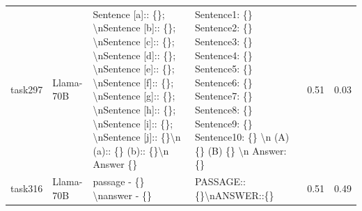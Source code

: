 \begin{longtable}{@{}p{0.8cm\tiny}p{1cm\tiny}p{4.1cm\ttfamily\tiny}p{4.1cm\ttfamily\tiny}p{0.8cm\tiny}p{0.8cm\tiny}@{}}
task297   & Llama-70B  & Sentence  {[}a{]}:: \{\}; \textbackslash{}nSentence  {[}b{]}:: \{\}; \textbackslash{}nSentence  {[}c{]}:: \{\}; \textbackslash{}nSentence  {[}d{]}:: \{\}; \textbackslash{}nSentence  {[}e{]}:: \{\}; \textbackslash{}nSentence  {[}f{]}:: \{\}; \textbackslash{}nSentence  {[}g{]}:: \{\}; \textbackslash{}nSentence  {[}h{]}:: \{\}; \textbackslash{}nSentence  {[}i{]}:: \{\}; \textbackslash{}nSentence  {[}j{]}:: \{\}\textbackslash{}n (a):: \{\} (b):: \{\}\textbackslash{}n Answer \{\}                         & Sentence1: \{\} Sentence2: \{\} Sentence3: \{\} Sentence4: \{\} Sentence5: \{\} Sentence6: \{\} Sentence7: \{\} Sentence8: \{\} Sentence9: \{\} Sentence10: \{\} \textbackslash{}n (A) \{\} (B) \{\} \textbackslash{}n Answer: \{\}                                                                                                                                                                                                                                                                                                                                               & 0.51 & 0.03 \\
task316   & Llama-70B  & passage - \{\} \textbackslash{}nanswer - \{\}                                                                                                                                                                                                                                                                                                                                                                                                                                                                           & PASSAGE::\{\}\textbackslash{}nANSWER::\{\}                                                                                                                                                                                                                                                                                                                                                                                                                                                                                                                                        & 0.51 & 0.49 \\

\end{longtable}
